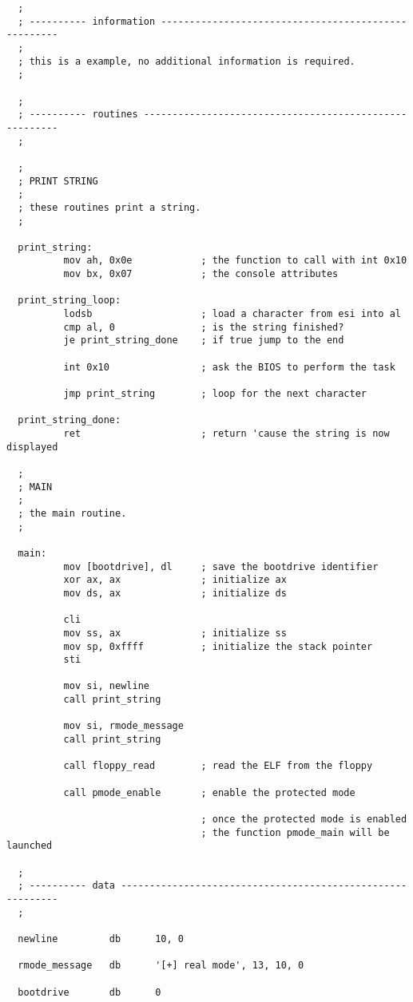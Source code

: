 \begin{verbatim}
  ;
  ; ---------- information ----------------------------------------------------
  ;
  ; this is a example, no additional information is required.
  ;

  ;
  ; ---------- routines -------------------------------------------------------
  ;

  ;
  ; PRINT STRING
  ;
  ; these routines print a string.
  ;

  print_string:
          mov ah, 0x0e            ; the function to call with int 0x10
          mov bx, 0x07            ; the console attributes

  print_string_loop:
          lodsb                   ; load a character from esi into al
          cmp al, 0               ; is the string finished?
          je print_string_done    ; if true jump to the end

          int 0x10                ; ask the BIOS to perform the task

          jmp print_string        ; loop for the next character

  print_string_done:
          ret                     ; return 'cause the string is now displayed

  ;
  ; MAIN
  ;
  ; the main routine.
  ;

  main:
          mov [bootdrive], dl     ; save the bootdrive identifier
          xor ax, ax              ; initialize ax
          mov ds, ax              ; initialize ds

          cli
          mov ss, ax              ; initialize ss
          mov sp, 0xffff          ; initialize the stack pointer
          sti

          mov si, newline
          call print_string

          mov si, rmode_message
          call print_string

          call floppy_read        ; read the ELF from the floppy

          call pmode_enable       ; enable the protected mode

                                  ; once the protected mode is enabled
                                  ; the function pmode_main will be launched

  ;
  ; ---------- data -----------------------------------------------------------
  ;

  newline         db      10, 0

  rmode_message   db      '[+] real mode', 13, 10, 0

  bootdrive       db      0
\end{verbatim}
